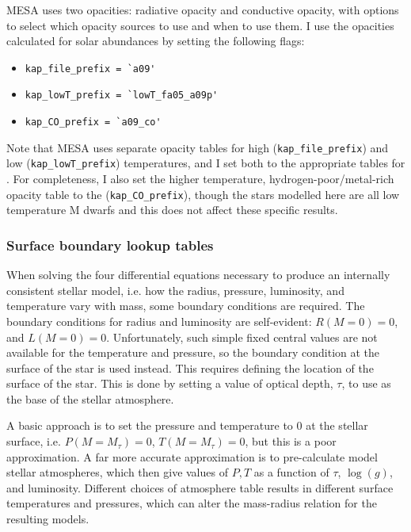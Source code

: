 MESA uses two opacities: radiative opacity and conductive opacity, with options to select which opacity sources to use and when to use them. I use the opacities calculated for \citet{Asplund2009} solar abundances by setting the following flags:
\begin{itemize}
    \item \lstinline{kap_file_prefix = `a09'}
    \item \lstinline{kap_lowT_prefix = `lowT_fa05_a09p'}
    \item \lstinline{kap_CO_prefix = `a09_co'}
\end{itemize}
Note that MESA uses separate opacity tables for high (\lstinline{kap_file_prefix}) and low (\lstinline{kap_lowT_prefix}) temperatures, and I set both to the appropriate tables for \citet{Asplund2009}. For completeness, I also set the higher temperature, hydrogen-poor/metal-rich opacity table to the \citet{Asplund2009} (\lstinline{kap_CO_prefix}), though the stars modelled here are all low temperature M dwarfs and this does not affect these specific results.



\subsubsection{Surface boundary lookup tables}
\label{sect:modelling:MESA surface boundary tables}

When solving the four differential equations necessary to produce an internally consistent stellar model, i.e. how the radius, pressure, luminosity, and temperature vary with mass, some boundary conditions are required.
The boundary conditions for radius and luminosity are self-evident: $R(M = 0) = 0$, and $L(M = 0) = 0$. Unfortunately, such simple fixed central values are not available for the temperature and pressure, so the boundary condition at the surface of the star is used instead.
This requires defining the location of the surface of the star. This is done by setting a value of optical depth, $\tau$, to use as the base of the stellar atmosphere.

A basic approach is to set the pressure and temperature to 0 at the stellar surface, i.e. $P(M = M_\tau) = 0$, $T(M = M_\tau) = 0$, but this is a poor approximation.
A far more accurate approximation is to pre-calculate model stellar atmospheres, which then give values of $P, T$ as a function of $\tau$, $\log(g)$, and luminosity.
Different choices of atmosphere table results in different surface temperatures and pressures, which can alter the mass-radius relation for the resulting models.

